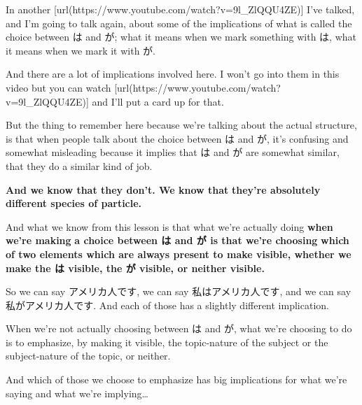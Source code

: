 In another [url(https://www.youtube.com/watch?v=9l_ZlQQU4ZE)] I've talked, and I'm going to talk again, about some of the implications of what is called the choice between は and が; what it means when we mark something with は, what it means when we mark it with が.

{}

And there are a lot of implications involved here. I won't go into them in this video but you can watch [url(https://www.youtube.com/watch?v=9l_ZlQQU4ZE)] and I'll put a card up for that.

But the thing to remember here because we're talking about the actual structure, is that when people talk about the choice between は and が, it's confusing and somewhat misleading because it implies that は and が are somewhat similar,\crlf
that they do a similar kind of job.

{\bf And we know that they don't. We know that} {\bf they're absolutely different species of particle.}

And what we know from this lesson is that what we're actually doing {\bf when we're making} {\bf a choice between は and が is that we're choosing} {\bf which of two elements which are always present to make visible, whether we make the は visible, the が visible, or neither visible.}

So we can say アメリカ人です, we can say 私はアメリカ人です, and we can say 私がアメリカ人です. And each of those has a slightly different implication.

When we're not actually choosing between は and が, what we're choosing to do is to emphasize, by making it visible, the topic-nature of the subject or the subject-nature of the topic, or neither.

And which of those we choose to emphasize has big implications for what we're saying and what we're implying\ldots{}

\stopsectionlevel

\stopsectionlevel
